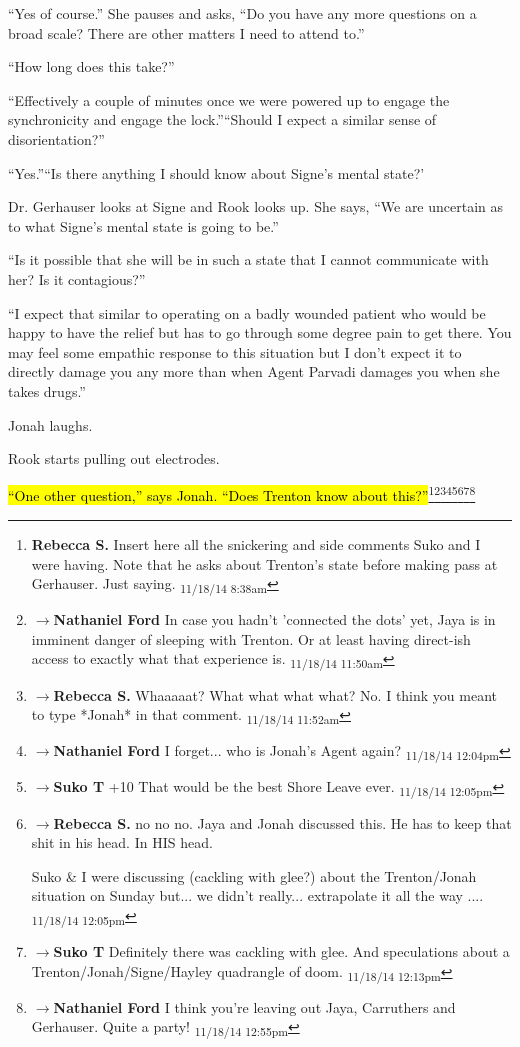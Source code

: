 ``Yes of course.''  She pauses and asks, ``Do you have any more questions on a broad scale?  There are other matters I need to attend to.''

``How long does this take?''

``Effectively a couple of minutes once we were powered up to engage the synchronicity and engage the lock.''``Should I expect a similar sense of disorientation?''

``Yes.''``Is there anything I should know about Signe's mental state?'

Dr. Gerhauser looks at Signe and Rook looks up.  She says, ``We are uncertain as to what Signe's mental state is going to be.''

``Is it possible that she will be in such a state that I cannot communicate with her?  Is it contagious?''

``I expect that similar to operating on a badly wounded patient who would be happy to have the relief but has to go through some degree pain to get there.  You may feel some empathic response to this situation but I don't expect it to directly damage you any more than when Agent Parvadi damages you when she takes drugs.''

Jonah laughs.  

Rook starts pulling out electrodes.

\hl{``One other question,'' says Jonah.  ``Does Trenton know about this?''}\footnote{\textbf{Rebecca S. }Insert here all the snickering and side comments Suko and I were having.  Note that he asks about Trenton's state before making pass at Gerhauser.  Just saying. \textsubscript{11/18/14 8:38am}}\footnote{$\rightarrow$\textbf{Nathaniel Ford }In case you hadn't 'connected the dots' yet, Jaya is in imminent danger of sleeping with Trenton. Or at least having direct-ish access to exactly what that experience is. \textsubscript{11/18/14 11:50am}}\footnote{$\rightarrow$\textbf{Rebecca S. }Whaaaaat?  What what what what?  No.  I think you meant to type *Jonah* in that comment. \textsubscript{11/18/14 11:52am}}\footnote{$\rightarrow$\textbf{Nathaniel Ford }I forget... who is Jonah's Agent again? \textsubscript{11/18/14 12:04pm}}\footnote{$\rightarrow$\textbf{Suko T }+10  That would be the best Shore Leave ever. \textsubscript{11/18/14 12:05pm}}\footnote{$\rightarrow$\textbf{Rebecca S. }no no no. Jaya and Jonah discussed this. He has to keep that shit in his head.  In HIS head. 

Suko \& I were discussing (cackling with glee?) about the Trenton/Jonah situation on Sunday but... we didn't really... extrapolate it all the way .... \textsubscript{11/18/14 12:05pm}}\footnote{$\rightarrow$\textbf{Suko T }Definitely there was cackling with glee.  And speculations about a Trenton/Jonah/Signe/Hayley quadrangle of doom. \textsubscript{11/18/14 12:13pm}}\footnote{$\rightarrow$\textbf{Nathaniel Ford }I think you're leaving out Jaya, Carruthers and Gerhauser. Quite a party! \textsubscript{11/18/14 12:55pm}}

